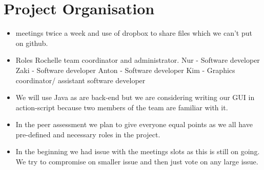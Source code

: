 \documentclass[]{article}
\begin{document}
 \section*{Project Organisation }
 \begin{itemize}
 \item meetings twice a week and use of dropbox to share files which we can't put on github. 
 \item Roles Rochelle team coordinator and administrator. 
 			Nur - Software developer
 			Zaki - Software developer 
 			Anton - Software developer 
 			Kim - Graphics coordinator/ assistant software developer  
 			
 \item We will use Java as are back-end but we are considering writing our GUI in action-script because two members of the team are familiar with it. 
 \item In the peer assessment we plan to give everyone equal points as we all have pre-defined and necessary roles in the project. 
 \item In the beginning we had issue with the meetings slots as this is still on going. We try to compromise on smaller issue and then just vote on any large issue.  
\end{itemize}
\end{document}
